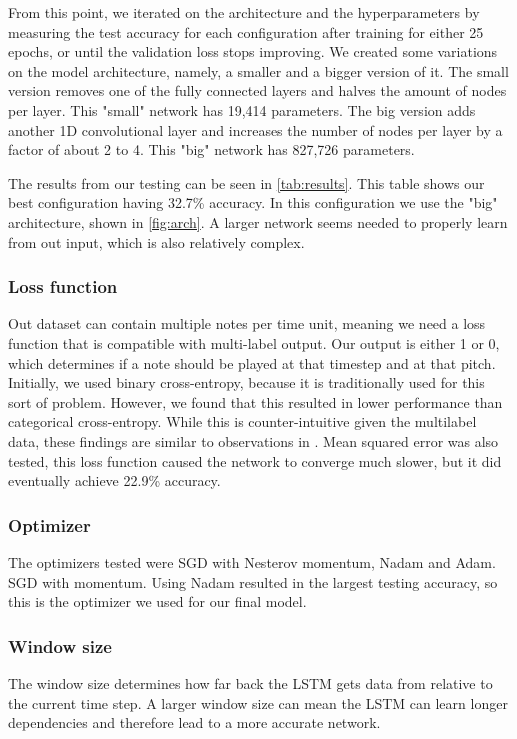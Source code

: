 \documentclass[11pt, twocolumn]{article}
\begin{document}
From this point, we iterated on the architecture and the hyperparameters by measuring the test accuracy for each configuration after training for either 25 epochs, or until the validation loss stops improving. We created some variations on the model architecture, namely, a smaller and a bigger version of it. The small version removes one of the fully connected layers and halves the amount of nodes per layer. This "small" network has 19,414 parameters. The big version adds another 1D convolutional layer and increases the number of nodes per layer by a factor of about 2 to 4. This "big" network has 827,726 parameters.

The results from our testing can be seen in \autoref{tab:results}. This table shows our best configuration having 32.7\% accuracy. In this configuration we use the "big" architecture, shown in \autoref{fig:arch}. A larger network seems needed to properly learn from out input, which is also relatively complex. 

\subsubsection{Loss function}
Out dataset can contain multiple notes per time unit, meaning we need a loss function that is compatible with multi-label output. Our output is either 1 or 0, which determines if a note should be played at that timestep and at that pitch.
Initially, we used binary cross-entropy, because it is traditionally used for this sort of problem. However, we found that this resulted in lower performance than categorical cross-entropy. While this is counter-intuitive given the multilabel data, these findings are similar to observations in \cite{Mahajan_2018_ECCV}. Mean squared error was also tested, this loss function caused the network to converge much slower, but it did eventually achieve 22.9\% accuracy.

\subsubsection{Optimizer}
The optimizers tested were SGD with Nesterov momentum, Nadam and Adam. SGD with momentum. Using Nadam resulted in the largest testing accuracy, so this is the optimizer we used for our final model.

\subsubsection{Window size}
The window size determines how far back the LSTM gets data from relative to the current time step. A larger window size can mean the LSTM can learn longer dependencies and therefore lead to a more accurate network.
\end{document}
